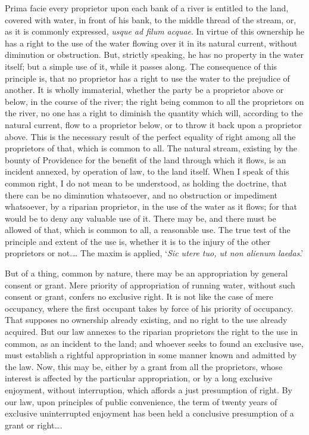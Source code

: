 Prima facie every proprietor upon each bank of a river is entitled to the land,
covered with water, in front of his bank, to the middle thread of the stream,
or, as it is commonly expressed, \textit{usque ad filum acquae}. In virtue of
this ownership he has a right to the use of the water flowing over it in its
natural current, without diminution or obstruction. But, strictly speaking, he
has no property in the water itself; but a simple use of it, while it passes
along. The consequence of this principle is, that no proprietor has a right to
use the water to the prejudice of another. It is wholly immaterial, whether the
party be a proprietor above or below, in the course of the river; the right
being common to all the proprietors on the river, no one has a right to diminish
the quantity which will, according to the natural current, flow to a proprietor
below, or to throw it back upon a proprietor above. This is the necessary result
of the perfect equality of right among all the proprietors of that, which is
common to all. The natural stream, existing by the bounty of Providence for the
benefit of the land through which it flows, is an incident annexed, by operation
of law, to the land itself. When I speak of this common right, I do not mean to
be understood, as holding the doctrine, that there can be no diminution
whatsoever, and no obstruction or impediment whatsoever, by a riparian
proprietor, in the use of the water as it flows; for that would be to deny any
valuable use of it. There may be, and there must be allowed of that, which is
common to all, a reasonable use. The true test of the principle and extent of
the use is, whether it is to the injury of the other proprietors or not.\ldots
The maxim is applied, `\textit{Sic utere tuo, ut non alienum laedas}.'

But of a thing, common by nature, there may be an appropriation by general
consent or grant. Mere priority of appropriation of running water, without such
consent or grant, confers no exclusive right. It is not like the case of mere
occupancy, where the first occupant takes by force of his priority of occupancy.
That supposes no ownership already existing, and no right to the use already
acquired. But our law annexes to the riparian proprietors the right to the use
in common, as an incident to the land; and whoever seeks to found an exclusive
use, must establish a rightful appropriation in some manner known and admitted
by the law. Now, this may be, either by a grant from all the proprietors, whose
interest is affected by the particular appropriation, or by a long exclusive
enjoyment, without interruption, which affords a just presumption of right. By
our law, upon principles of public convenience, the term of twenty years of
exclusive uninterrupted enjoyment has been held a conclusive presumption of a
grant or right\ldots .

